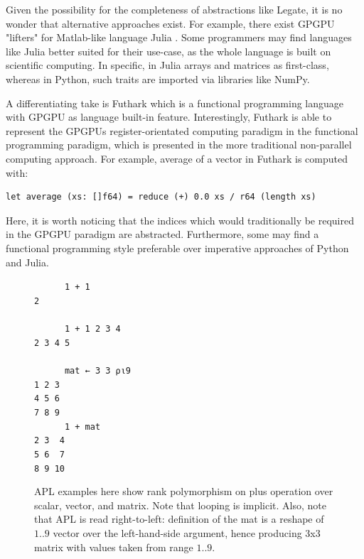 \documentclass{IEEEtran}
\begin{document}
Given the possibility for the completeness of abstractions like Legate, it is no wonder that alternative approaches exist. For example, there exist GPGPU "lifters" for Matlab-like language Julia \cite{bezanson2017julia}. Some programmers may find languages like Julia better suited for their use-case, as the whole language is built on scientific computing. In specific, in Julia arrays and matrices as first-class, whereas in Python, such traits are imported via libraries like NumPy.

A differentiating take is Futhark \cite{Henriksen:2017:FPF:3062341.3062354} which is a functional programming language with GPGPU as language built-in feature. Interestingly, Futhark is able to represent the GPGPUs register-orientated computing paradigm in the functional programming paradigm, which is presented in the more traditional non-parallel computing approach. For example, average of a vector in Futhark is computed with:

\begin{lstlisting}
let average (xs: []f64) = reduce (+) 0.0 xs / r64 (length xs)
\end{lstlisting}

Here, it is worth noticing that the indices which would traditionally be required in the GPGPU paradigm are abstracted. Furthermore, some may find a functional programming style preferable over imperative approaches of Python and Julia.

\begin{figure}
\verb|      1 + 1|\\
\verb|2|\\
\\
\verb|      1 + 1 2 3 4|\\
\verb|2 3 4 5|\\
\\
\verb|      mat ← 3 3 ⍴⍳9|\\
\verb|1 2 3|\\
\verb|4 5 6|\\
\verb|7 8 9|
\\
\verb|      1 + mat|\\
\verb|2 3  4|\\
\verb|5 6  7|\\
\verb|8 9 10|

  \caption{APL examples here show rank polymorphism on plus operation over scalar, vector, and matrix. Note that looping is implicit. Also, note that APL is read right-to-left: definition of the mat is a reshape of $1..9$ vector over the left-hand-side argument, hence producing 3x3 matrix with values taken from range $1..9$.}
  \label{fig:apl}
\end{figure}
\end{document}
